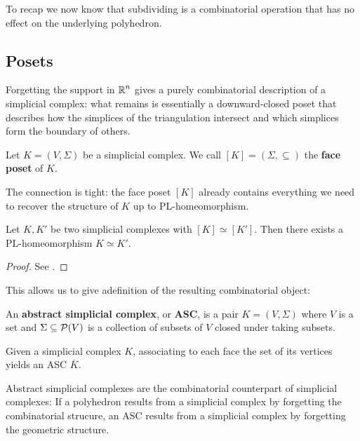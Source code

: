 To recap we now know that subdividing is a combinatorial operation that has no effect on the underlying polyhedron.



\subsection{Posets}

Forgetting the support in $\operatorname{\mathbb{R}}^n$ gives a purely combinatorial description of a simplicial complex: what remains is essentially a downward-closed poset that describes how the simplices of the triangulation intersect and which simplices form the boundary of others.
\begin{definition}
    Let $K=(V,\Sigma)$ be a simplicial complex. We call $[K]=(\Sigma,\subseteq)$ the \textbf{face poset} of $K$.
\end{definition}

The connection is tight: the face poset $[K]$ already contains everything we need to recover the structure of $K$ up to PL-homeomorphism.
\begin{lemma}
    Let $K,K'$ be two simplicial complexes with $[K]\simeq [K']$. Then there exists a PL-homeomorphism $K\simeq K'$.
\end{lemma}
\begin{proof}
    See \cite[Lemma 2.18]{PLTopology}.
\end{proof}

This allows us to give adefinition of the resulting combinatorial object:
\begin{definition}[ASC]
    An \textbf{abstract simplicial complex}, or \textbf{ASC}, is a pair $K=(V,\Sigma)$ where $V$ is a set and $\Sigma\subseteq \operatorname{\mathcal{P}}(V)$ is a collection of subsets of $V$ closed under taking subsets.

    Given a simplicial complex $K$, associating to each face the set of its vertices yields an ASC $\overline{K}$.
\end{definition}

Abstract simplicial complexes are the combinatorial counterpart of simplicial complexes: If a polyhedron results from a simplicial complex by forgetting the combinatorial strucure, an ASC results from a simplicial complex by forgetting the geometric structure.

